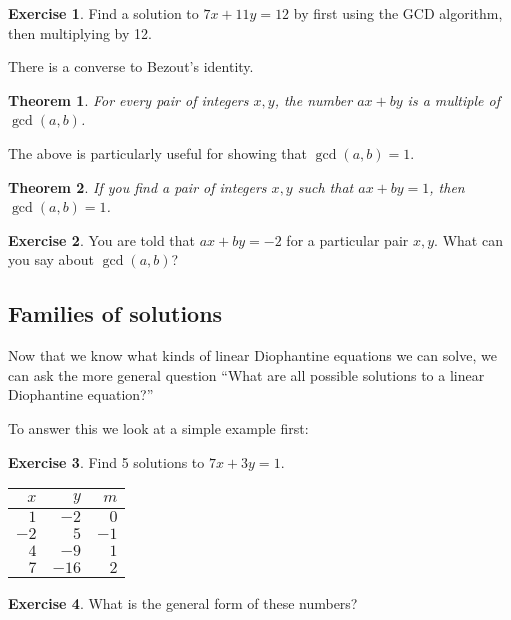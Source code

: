 \documentclass[11pt]{article}
\newtheorem{thm}{Theorem}
\theoremstyle{definition}
\newtheorem{exercise}{Exercise}
\numberwithin{thm}{section}
\begin{document}
\begin{exercise} Find a solution to $7x + 11y = 12$ by first using the GCD algorithm, then multiplying by 12.
\end{exercise}

There is a converse to Bezout's identity.

\begin{thm} For every pair of integers $x,y$, the number $ax + by$ is a multiple of $\gcd(a,b)$.
\end{thm}

The above is particularly useful for showing that $\gcd(a,b) = 1$.

\begin{thm} If you find a pair of integers $x,y$ such that $ax+by = 1$, then $\gcd(a,b)=1$.
\end{thm}

\begin{exercise} You are told that $ax + by = -2$ for a particular pair $x,y$. What can you say about $\gcd(a,b)$?
\end{exercise}

\subsection{Families of solutions}

Now that we know what kinds of linear Diophantine equations we can solve, we can ask the more general question ``What are all possible solutions to a linear Diophantine equation?''

To answer this we look at a simple example first:

\begin{exercise} Find 5 solutions to $7x + 3y = 1$. 
\end{exercise}

\begin{table}[!ht]
\begin{tabular}{r|r|r}
$x$  & $y$   & $m$  \\ \hline
$1$  & $-2$  & $0$  \\
$-2$ & $5$   & $-1$ \\
$4$  & $-9$  & $1$  \\
$7$  & $-16$ & $2$ 
\end{tabular}
\end{table}

\begin{exercise} What is the general form of these numbers?
\end{exercise}
\end{document}
